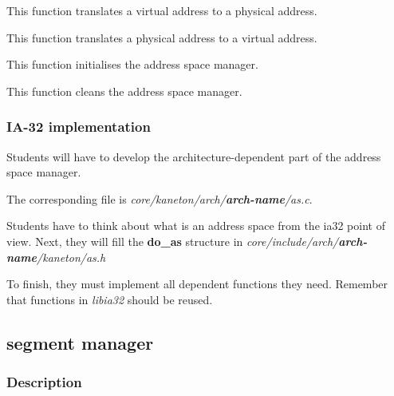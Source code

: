 
This function translates a virtual address to a physical address.


This function translates a physical address to a virtual address.


This function initialises the address space manager.


This function cleans the address space manager.

%
%

\subsubsection{IA-32 implementation}

Students will  have to develop the architecture-dependent  part of the
address space manager.

The corresponding file is \textit{core/kaneton/arch/\textbf{arch-name}/as.c}.

Students have  to think about what  is an address space  from the ia32
point of view.  Next, they will fill the \textbf{do\_as} structure in
\textit{core/include/arch/\textbf{arch-name}/kaneton/as.h}

To  finish,   they  must   implement  all  dependent   functions  they
need. Remember that functions in \textit{libia32} should be reused.

%
%

\subsection{segment manager}

\subsubsection{Description}

